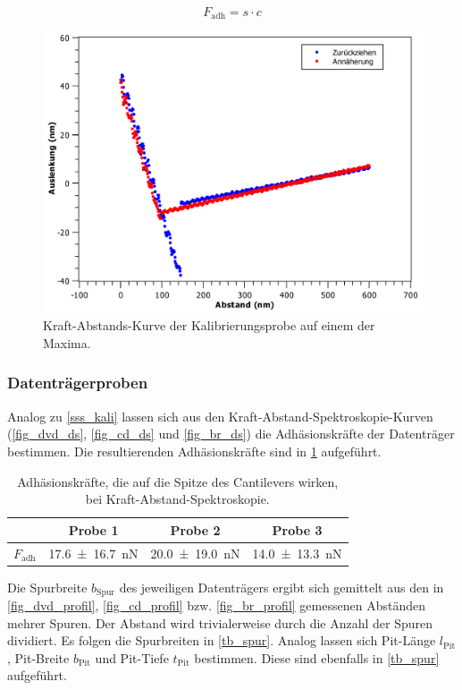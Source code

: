\documentclass[
	a4paper,
	12pt,
	pagesize,
	ngerman
]{scrartcl}
\begin{document}
\begin{equation}
			\label{eq_adh}
			F_\text{adh} = s \cdot c
	\end{equation}

\begin {figure}[H]
\includegraphics[width=.7\linewidth]{images/Kali/DS1}
\caption{Kraft-Abstands-Kurve der Kalibrierungsprobe auf einem der Maxima.}
\label{fig_kali_expl}
\end{figure}

\subsubsection{Datenträgerproben}

Analog zu \cref{sss_kali} lassen sich aus den Kraft-Abstand-Spektroskopie-Kurven (\cref{fig_dvd_ds}, \cref{fig_cd_ds} und \cref{fig_br_ds}) die Adhäsionskräfte der Datenträger bestimmen.
	Die resultierenden Adhäsionskräfte sind in \cref{tb_adh} aufgeführt.

\begin{table}[H]
		\centering
		\begin{tabular}{ c | c | c | c }
			 & Probe 1 & Probe 2 & Probe 3\\ \hline
			$F_\text{adh}$ & \SI{17.6+-16.7}{nN} & \SI{20.0+-19.0}{nN} &\SI{14.0+-13.3}{nN} \\
		\end{tabular}
		\caption{Adhäsionskräfte, die auf die Spitze des Cantilevers wirken, bei Kraft-Abstand-Spektroskopie.}
		\label{tb_adh}
\end{table}

	Die Spurbreite $b_\text{Spur}$ des jeweiligen Datenträgers ergibt sich gemittelt aus den in \cref{fig_dvd_profil}, \cref{fig_cd_profil} bzw. \cref{fig_br_profil} gemessenen Abständen mehrer Spuren.
	Der Abstand wird trivialerweise durch die Anzahl der Spuren dividiert.
	Es folgen die Spurbreiten in \cref{tb_spur}.
	Analog lassen sich Pit-Länge $l_\text{Pit}$ , Pit-Breite $b_\text{Pit}$ und Pit-Tiefe $t_\text{Pit}$ bestimmen.
	Diese sind ebenfalls in \cref{tb_spur} aufgeführt.
\end{document}
